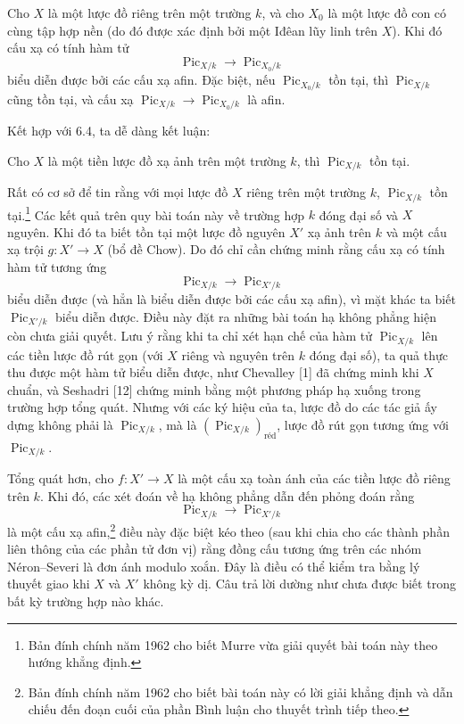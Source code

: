  Cho $X$ là một lược đồ riêng trên một trường $k$, và cho
$X_0$ là một lược đồ con có cùng tập hợp nền (do đó được xác định bởi một Iđêan
lũy linh trên $X$). Khi đó cấu xạ có tính hàm tử
\[
\operatorname{Pic}_{X/k}\longrightarrow\operatorname{Pic}_{X_0/k}
\]
biểu diễn được bởi các cấu xạ afin. Đặc biệt, nếu
$\operatorname{Pic}_{X_0/k}$ tồn tại, thì $\operatorname{Pic}_{X/k}$ cũng tồn
tại, và cấu xạ
$\operatorname{Pic}_{X/k}\longrightarrow\operatorname{Pic}_{X_0/k}$ là afin.

Kết hợp với 6.4, ta dễ dàng kết luận:

 Cho $X$ là một tiền lược đồ xạ ảnh trên một trường $k$,
thì $\operatorname{Pic}_{X/k}$ tồn tại.

 Rất có cơ sở để tin rằng với mọi lược đồ $X$ riêng trên
một trường $k$, $\operatorname{Pic}_{X/k}$ tồn tại.\footnote{Bản đính chính năm
1962 cho biết Murre vừa giải quyết bài toán này theo hướng khẳng định.} Các kết quả trên
quy bài toán này về trường hợp $k$ đóng đại số và $X$ nguyên. Khi đó ta biết
tồn tại một lược đồ nguyên $X'$ xạ ảnh trên $k$ và một cấu xạ trội
$g:X'\longrightarrow X$ (bổ đề Chow). Do đó chỉ cần chứng minh rằng
cấu xạ có tính hàm tử tương ứng
\[
\operatorname{Pic}_{X/k}\longrightarrow\operatorname{Pic}_{X'/k}
\]
biểu diễn được (và hẳn là biểu diễn được bởi các cấu xạ afin), vì mặt khác ta
biết $\operatorname{Pic}_{X'/k}$ biểu diễn được. Điều này đặt ra những bài toán
hạ không phẳng hiện còn chưa giải quyết. Lưu ý rằng khi ta chỉ xét hạn chế của
hàm tử $\operatorname{Pic}_{X/k}$ lên các tiền lược đồ rút gọn (với $X$ riêng
và nguyên trên $k$ đóng đại số), ta quả thực thu được một hàm tử biểu diễn
được, như Chevalley [1] đã chứng minh khi $X$ chuẩn, và Seshadri [12] chứng minh
bằng một phương pháp hạ xuống trong trường hợp tổng quát. Nhưng với các ký hiệu
của ta, lược đồ do các tác giả ấy dựng không phải là
$\operatorname{Pic}_{X/k}$, mà là
$(\operatorname{Pic}_{X/k})_{\mathrm{réd}}$, lược đồ rút gọn tương ứng với
$\operatorname{Pic}_{X/k}$.

 Tổng quát hơn, cho $f:X'\longrightarrow X$ là một cấu
xạ toàn ánh của các tiền lược đồ riêng trên $k$. Khi đó, các xét đoán về hạ
không phẳng dẫn đến phỏng đoán rằng
\[
\operatorname{Pic}_{X/k}\longrightarrow\operatorname{Pic}_{X'/k}
\]
là một cấu xạ afin,\footnote{Bản đính chính năm 1962 cho biết bài toán này có
lời giải khẳng định và dẫn chiếu đến đoạn cuối của phần Bình luận cho thuyết trình
tiếp theo.} điều này đặc biệt kéo theo (sau khi chia cho các thành phần liên
thông của các phần tử đơn vị) rằng đồng cấu tương ứng trên các nhóm
Néron--Severi là đơn ánh modulo xoắn. Đây là điều có thể kiểm tra bằng lý thuyết
giao khi $X$ và $X'$ không kỳ dị. Câu trả lời dường như chưa được biết trong
bất kỳ trường hợp nào khác.

